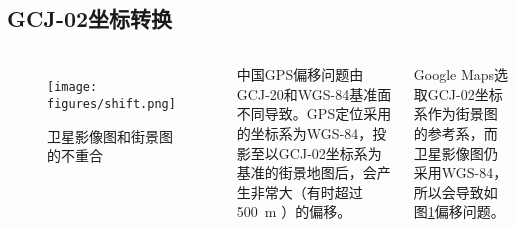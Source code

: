 \documentclass[10pt,xcolor=dvipsnames,fontset=none,punct=CCT]{ctexbeamer}
\begin{document}
\subsection{GCJ-02坐标转换}
\begin{frame}
  
  \begin{columns}[c]
    \begin{figure}[ht]
      \centering
      \texttt{[image: figures/shift.png]}
      \caption{\label{fig:shift}卫星影像图和街景图的不重合}
    \end{figure}

    \setlength{\parskip}{7pt plus 3pt minus 2pt}
    中国GPS偏移问题由GCJ-20和WGS-84基准面不同导致。GPS定位采用的坐标系为WGS-84，投影至以GCJ-02坐标系为基准的街景地图后，会产生非常大（有时超过 \qty{500}{m} ）的偏移。

    Google Maps选取GCJ-02坐标系作为街景图的参考系，而卫星影像图仍采用WGS-84，所以会导致如图\ref{fig:shift}偏移问题。
  \end{columns}
\end{frame}
\end{document}
